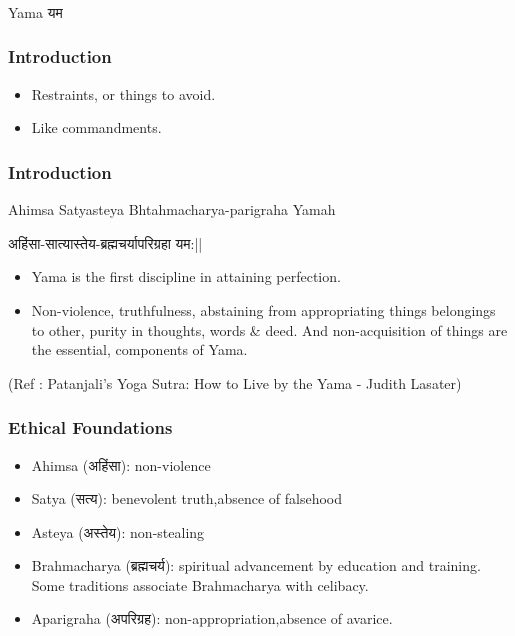 \begin{frame}[fragile]\frametitle{}
\begin{center}
{\Large Yama यम}
\end{center}
\end{frame}

\begin{frame}[fragile]\frametitle{Introduction}


	\begin{itemize}
	\item Restraints, or things to avoid.
	\item Like commandments.
	\end{itemize}

\end{frame}


\begin{frame}[fragile]\frametitle{Introduction}

Ahimsa Satyasteya Bhtahmacharya-parigraha Yamah

अहिंसा-सात्यास्तेय-ब्रह्मचर्यापरिग्रहा यम:||

	\begin{itemize}
	\item Yama  is 
the  first  discipline  in  attaining 
perfection.
	\item Non-violence,  truthfulness, abstaining  from  appropriating things  belongings  to  other, 
purity  in  thoughts,  words  \& 
deed.  And  non-acquisition  of 
things  are  the  essential, 
components of Yama. 

	\end{itemize}

{\tiny (Ref : Patanjali's Yoga Sutra: How to Live by the Yama - Judith Lasater)}

\end{frame}


\begin{frame}[fragile]\frametitle{Ethical Foundations}

	\begin{itemize}
	\item Ahimsa (अहिंसा): non-violence
	\item Satya (सत्य): benevolent truth,absence of falsehood
	\item Asteya (अस्तेय): non-stealing
	\item Brahmacharya (ब्रह्मचर्य): spiritual advancement by education and training. Some traditions associate Brahmacharya with celibacy.
	\item Aparigraha (अपरिग्रह): non-appropriation,absence of avarice.

	\end{itemize}

\end{frame}


